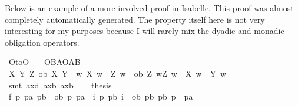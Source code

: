 \begin{isabellebody}
\begin{isamarkuptext}
Below is an example of a more involved proof in Isabelle. This proof was almost completely automatically
generated. The property itself here is not very interesting for my purposes because I will rarely mix the dyadic
and monadic obligation operators.%
\end{isamarkuptext}\isamarkuptrue%
\isamarkupfalse%
\ O{\isacharunderscore}to{\isacharunderscore}O{\isacharcolon}\isanewline
\ \ \ {\isachardoublequoteopen}{\isasymTurnstile}{\isacharparenleft}O{\isacharbraceleft}B{\isacharbar}A{\isacharbraceright}\isactrlbold {\isasymrightarrow}O{\isacharbraceleft}{\isacharparenleft}A\isactrlbold {\isasymrightarrow}B{\isacharparenright}{\isacharbar}\isactrlbold {\isasymtop}{\isacharbraceright}{\isacharparenright}{\isachardoublequoteclose}\isanewline
%
\isadelimproof
%
\endisadelimproof
%
\isatagproof
{}\isamarkupfalse%
{\isacharminus}\isanewline
\ \ \isamarkupfalse%
\ {\isachardoublequoteopen}{\isasymforall}X\ Y\ Z{\isachardot}\ {\isacharparenleft}ob\ X\ Y\ {\isasymand}\ {\isacharparenleft}{\isasymforall}w{\isachardot}\ X\ w\ {\isasymlongrightarrow}\ Z\ w{\isacharparenright}{\isacharparenright}\ {\isasymlongrightarrow}\ ob\ Z\ {\isacharparenleft}{\isasymlambda}w{\isachardot}{\isacharparenleft}Z\ w\ {\isasymand}\ {\isasymnot}X\ w{\isacharparenright}\ {\isasymor}\ Y\ w{\isacharparenright}{\isachardoublequoteclose}\isanewline
%
\isanewline
\ \ \ \ \isamarkupfalse%
\ {\isacharparenleft}smt\ ax{\isacharunderscore}{}d\ ax{\isacharunderscore}{}b\ ax{\isacharunderscore}{}b{\isacharprime}{\isacharprime}{\isacharparenright}\isanewline
%
\isanewline
\ \ \isamarkupfalse%
\ {\isacharquery}thesis\isanewline
\ \ \isamarkupfalse%
\ {\isacharminus}\isanewline
\ \ \ \ \isamarkupfalse%
\ f{}{\isacharcolon}\ {\isachardoublequoteopen}{\isasymforall}p\ pa\ pb{\isachardot}\ {\isacharparenleft}{\isacharparenleft}{\isasymnot}\ {\isacharparenleft}ob\ p\ pa{\isacharparenright}{\isacharparenright}\ {\isasymor}\ {\isacharparenleft}{\isasymexists}i{\isachardot}\ {\isacharparenleft}p\isactrlbold {\isasymand}{\isacharparenleft}\isactrlbold {\isasymnot}\ pb{\isacharparenright}{\isacharparenright}\ i{\isacharparenright}{\isacharparenright}\ {\isasymor}\ {\isacharparenleft}ob\ pb\ {\isacharparenleft}{\isacharparenleft}pb\isactrlbold {\isasymand}{\isacharparenleft}\isactrlbold {\isasymnot}\ p{\isacharparenright}{\isacharparenright}\isactrlbold {\isasymor}\ \ pa{\isacharparenright}{\isacharparenright}{\isachardoublequoteclose}\isanewline

\end{isabellebody}
